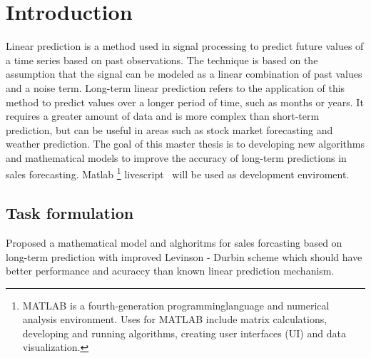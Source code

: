 
{}

\chapter*{Introduction}

Linear prediction is a method used in signal processing to predict future values of a time series based on past observations.
The technique is based on the assumption that the signal can be modeled as a linear combination of past values and a noise term.
Long-term linear prediction refers to the application of this method to predict values over a longer period of time, such as months or years.
It requires a greater amount of data and is more complex than short-term prediction, but can be useful in areas such as stock market forecasting and
weather prediction. The goal of this master thesis is to developing new algorithms and mathematical models to improve the accuracy of long-term predictions
in sales forecasting. Matlab \footnote{MATLAB is a fourth-generation programminglanguage and numerical analysis environment.
Uses for MATLAB include matrix calculations, developing and running algorithms, creating user interfaces (UI) and data visualization.}
livescript~\cite{livescript} will be used as development enviroment.

\section*{Task formulation}

Proposed a mathematical model and alghoritms for sales forcasting based on long-term prediction with improved Levinson - Durbin scheme 
which should have better performance and acuraccy than known linear prediction mechanism.
